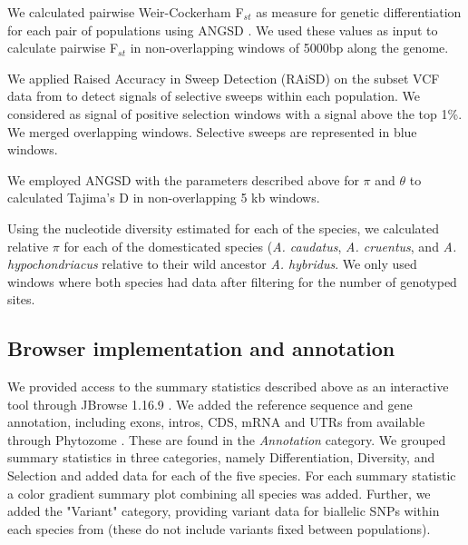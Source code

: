 \documentclass[9pt,twocolumn,twoside]{celabRxiv}
\begin{document}
We calculated pairwise Weir-Cockerham F$_{st}$ \citep{wright1950genetical} as measure for genetic differentiation for each pair of populations using ANGSD \citep{korneliussen2014angsd}. 
We used these values as input to calculate pairwise F$_{st}$ in non-overlapping windows of 5000bp along the genome. 


We applied Raised Accuracy in Sweep Detection (RAiSD) \citep{alachiotis2018raisd} on the subset VCF data from \citet{stetter2020parallel} to detect signals of selective sweeps within each population. We considered as signal of positive selection windows with a signal above the top 1\%. We merged overlapping windows. Selective sweeps are represented in blue windows.

We employed ANGSD \citep{korneliussen2014angsd} with the parameters described above for $\pi$ and $\theta$ to calculated Tajima's D in non-overlapping 5 kb windows. 

Using the nucleotide diversity estimated for each of the species, we calculated relative $\pi$ for each of the domesticated species (\textit{A. caudatus}, \textit{A. cruentus}, and \textit{A. hypochondriacus} relative to their wild ancestor \textit{A. hybridus}.
We only used windows where both species had data after filtering for the number of genotyped sites.
 



\subsection{Browser implementation and annotation}
We provided access to the summary statistics described above as an interactive tool through JBrowse 1.16.9 \citep{skinner2009jbrowse}.
We added the reference sequence and gene annotation, including exons, intros, CDS, mRNA and UTRs from \citet{lightfoot2017single} available through Phytozome \citep{goodstein2012phytozome}. 
These are found in the \textit{Annotation} category.
We grouped summary statistics in three categories, namely Differentiation, Diversity, and Selection and added data for each of the five species.
For each summary statistic a color gradient summary plot combining all species was added. 
Further, we added the "Variant" category, providing variant data for biallelic SNPs within each species from \citet{stetter2020parallel} (these do not include variants fixed between populations).
\end{document}
